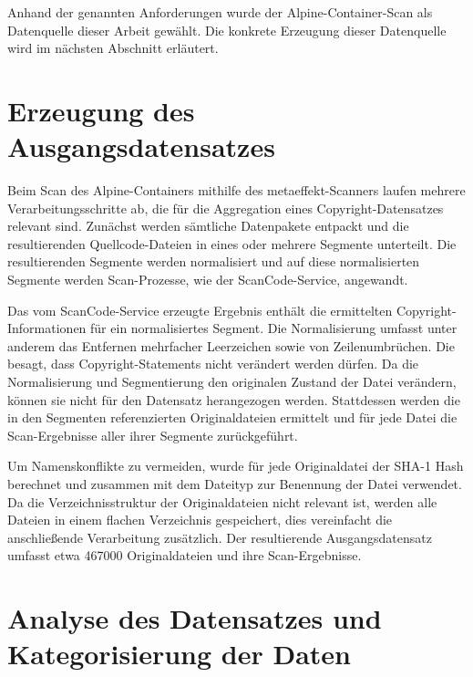 Anhand der genannten Anforderungen wurde der Alpine-Container-Scan als Datenquelle dieser Arbeit gewählt.
Die konkrete Erzeugung dieser Datenquelle wird im nächsten Abschnitt erläutert.


\section{Erzeugung des Ausgangsdatensatzes}\label{sec:erzeugung-datensatz}

Beim Scan des Alpine-Containers mithilfe des metaeffekt-Scanners laufen mehrere Verarbeitungsschritte ab, die für die Aggregation eines Copyright-Datensatzes relevant sind.
Zunächst werden sämtliche Datenpakete entpackt und die resultierenden Quellcode-Dateien in eines oder mehrere Segmente unterteilt.
Die resultierenden Segmente werden normalisiert und auf diese normalisierten Segmente werden Scan-Prozesse, wie der ScanCode-Service, angewandt.

Das vom ScanCode-Service erzeugte Ergebnis enthält die ermittelten Copyright-Informationen für ein normalisiertes Segment.
Die Normalisierung umfasst unter anderem das Entfernen mehrfacher Leerzeichen sowie von Zeilenumbrüchen.
Die  besagt, dass Copyright-Statements nicht verändert werden dürfen.
Da die Normalisierung und Segmentierung den originalen Zustand der Datei verändern, können sie nicht für den Datensatz herangezogen werden.
Stattdessen werden die in den Segmenten referenzierten Originaldateien ermittelt und für jede Datei die Scan-Ergebnisse aller ihrer Segmente zurückgeführt.

Um Namenskonflikte zu vermeiden, wurde für jede Originaldatei der SHA-1 Hash berechnet und zusammen mit dem Dateityp zur Benennung der Datei verwendet.
Da die Verzeichnisstruktur der Originaldateien nicht relevant ist, werden alle Dateien in einem flachen Verzeichnis gespeichert, dies vereinfacht die anschließende Verarbeitung zusätzlich.
Der resultierende Ausgangsdatensatz umfasst etwa \num{467000} Originaldateien und ihre Scan-Ergebnisse.


\section{Analyse des Datensatzes und Kategorisierung der Daten}\label{sec:analyse-datensatz}

